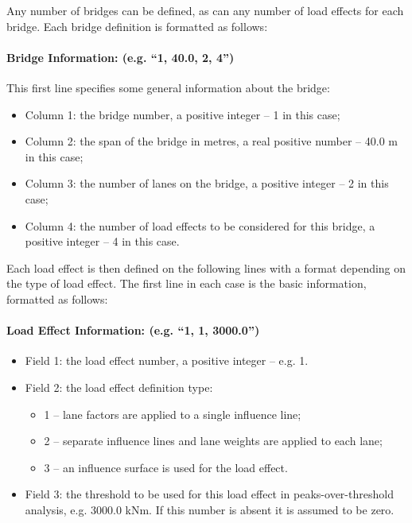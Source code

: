 \documentclass[
]{article}
\begin{document}
Any number of bridges can be defined, as can any number of load effects
for each bridge. Each bridge definition is formatted as follows:

\paragraph*{Bridge Information: (e.g. ``1, 40.0, 2,
4'')}\label{bridge-information-e.g.-1-40.0-2-4}

This first line specifies some general information about the bridge:

\begin{itemize}
\item
  Column 1: the bridge number, a positive integer -- 1 in this case;
\item
  Column 2: the span of the bridge in metres, a real positive number --
  40.0 m in this case;
\item
  Column 3: the number of lanes on the bridge, a positive integer -- 2
  in this case;
\item
  Column 4: the number of load effects to be considered for this bridge,
  a positive integer -- 4 in this case.
\end{itemize}

Each load effect is then defined on the following lines with a format
depending on the type of load effect. The first line in each case is the
basic information, formatted as follows:

\paragraph*{Load Effect Information: (e.g. ``1, 1,
3000.0'')}\label{load-effect-information-e.g.-1-1-3000.0}

\begin{itemize}
\item
  Field 1: the load effect number, a positive integer -- e.g. 1.
\item
  Field 2: the load effect definition type:

  \begin{itemize}
  \item
    1 -- lane factors are applied to a single influence line;
  \item
    2 -- separate influence lines and lane weights are applied to each
    lane;
  \item
    3 -- an influence surface is used for the load effect.
  \end{itemize}
\item
  Field 3: the threshold to be used for this load effect in
  peaks-over-threshold analysis, e.g. 3000.0 kNm. If this number is
  absent it is assumed to be zero.
\end{itemize}
\end{document}
